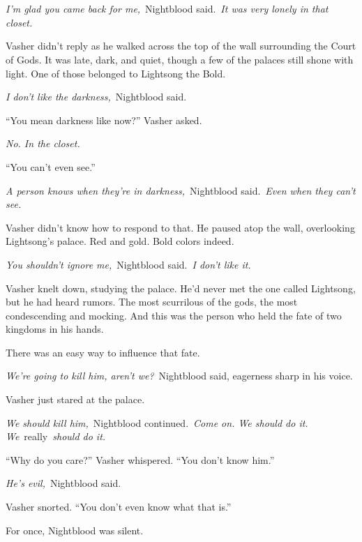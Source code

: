 \chapter{}

\textit{I’m glad you came back for me,}~Nightblood said.~\textit{It was very lonely in that closet.}

Vasher didn’t reply as he walked across the top of the wall surrounding the Court of Gods. It was late, dark, and quiet, though a few of the palaces still shone with light. One of those belonged to Lightsong the Bold.

\textit{I don’t like the darkness,}~Nightblood said.

“You mean darkness like now?” Vasher asked.

\textit{No. In the closet.}

“You can’t even see.”

\textit{A person knows when they’re in darkness,}~Nightblood said.~\textit{Even when they can’t see.}

Vasher didn’t know how to respond to that. He paused atop the wall, overlooking Lightsong’s palace. Red and gold. Bold colors indeed.

\textit{You shouldn’t ignore me,}~Nightblood said.~\textit{I don’t like it.}

Vasher knelt down, studying the palace. He’d never met the one called Lightsong, but he had heard rumors. The most scurrilous of the gods, the most condescending and mocking. And this was the person who held the fate of two kingdoms in his hands.

There was an easy way to influence that fate.

\textit{We’re going to kill him, aren’t we?}~Nightblood said, eagerness sharp in his voice.

Vasher just stared at the palace.

\textit{We should kill him,}~Nightblood continued.~\textit{Come on. We should do it. We}~really~\textit{should do it.}

“Why do you care?” Vasher whispered. “You don’t know him.”

\textit{He’s evil,}~Nightblood said.

Vasher snorted. “You don’t even know what that is.”

For once, Nightblood was silent.

